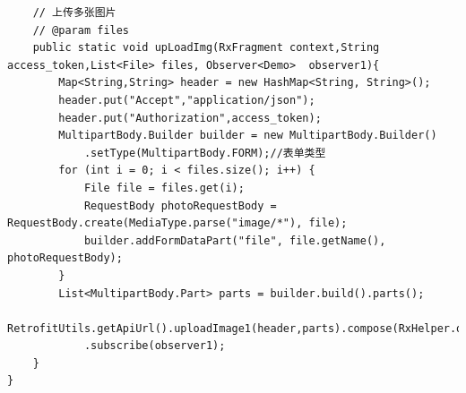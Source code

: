 \documentclass[9pt, b5paper]{article}
\begin{document}
\begin{verbatim}
    // 上传多张图片
    // @param files
    public static void upLoadImg(RxFragment context,String access_token,List<File> files, Observer<Demo>  observer1){
        Map<String,String> header = new HashMap<String, String>();
        header.put("Accept","application/json");
        header.put("Authorization",access_token);
        MultipartBody.Builder builder = new MultipartBody.Builder()
            .setType(MultipartBody.FORM);//表单类型
        for (int i = 0; i < files.size(); i++) {
            File file = files.get(i);
            RequestBody photoRequestBody = RequestBody.create(MediaType.parse("image/*"), file);
            builder.addFormDataPart("file", file.getName(), photoRequestBody);
        }
        List<MultipartBody.Part> parts = builder.build().parts();
        RetrofitUtils.getApiUrl().uploadImage1(header,parts).compose(RxHelper.observableIO2Main(context))
            .subscribe(observer1);
    }
}
\end{verbatim}
\end{document}
